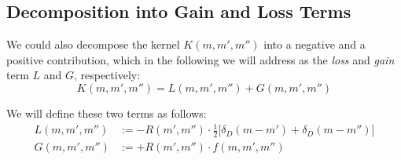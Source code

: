 
    \subsection{Decomposition into Gain and Loss Terms}

        We could also decompose the kernel $K(m,m',m'')$ into a negative and a 
        positive contribution, which in the following we will address as the \textit{loss} and 
        \textit{gain} term $L$ and $G$, respectively:
        \begin{equation}
            K(m,m',m'') = L(m, m', m'') + G(m, m', m'') 
        \end{equation}

        We will define these two terms as follows:
        \begin{align}
            \label{eq:definition_of_kernel_gain_and_loss}
            L(m, m', m'') 
                &:= -R(m',m'') \cdot \frac{1}{2} \bigg[\delta_D(m-m')+\delta_D(m-m'')\bigg] \\
            G(m, m', m'') 
                &:= +R(m',m'') \cdot f(m, m', m'') 
        \end{align}


